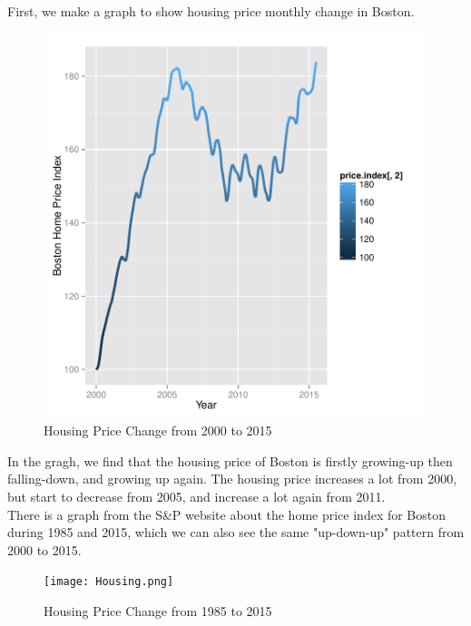 \documentclass[t,ucs,12pt,xcolor=dvipsnames]{beamer}
\begin{document}
First, we make a graph to show housing price monthly change in Boston.
\begin{figure}[H]
 \begin{center}
\includegraphics{fig--001}
 \caption{Housing Price Change from 2000 to 2015}
 \end{center}
\end{figure}
In the gragh, we find that the housing price of Boston is firstly growing-up then falling-down, and growing up again. The housing price increases a lot from 2000, but start to decrease from 2005, and increase a lot again from 2011.\\

There is a graph from the S\&P website about the home price index for Boston during 1985 and 2015, which we can also see the same "up-down-up" pattern from 2000 to 2015.

\begin{figure}[H]
  \centering
  \texttt{[image: Housing.png]}
  \caption{Housing Price Change from 1985 to 2015}
\end{figure}
\end{document}
